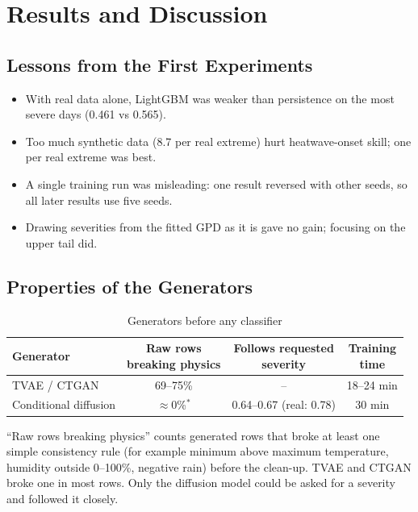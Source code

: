 \documentclass[12pt,a4paper]{report}
\begin{document}
\chapter{Results and Discussion}
\label{ch:results}
\section{Lessons from the First Experiments}
\label{sec:lessons}
\begin{itemize}
  \item With real data alone, LightGBM was weaker than persistence on the most severe days (0.461 vs 0.565).
  \item Too much synthetic data (8.7 per real extreme) hurt heatwave-onset skill; one per real extreme was best.
  \item A single training run was misleading: one result reversed with other seeds, so all later results use five seeds.
  \item Drawing severities from the fitted GPD as it is gave no gain; focusing on the upper tail did.
\end{itemize}

\section{Properties of the Generators}
\begin{table}[H]
\centering
\caption{Generators before any classifier}
\label{tab:genstats}
\small
\begin{tabular}{|l|c|c|c|}
\hline
\textbf{Generator} & \makecell{\textbf{Raw rows}\\\textbf{breaking physics}} & \makecell{\textbf{Follows requested}\\\textbf{severity}} & \makecell{\textbf{Training}\\\textbf{time}} \\ \hline
TVAE / CTGAN & 69--75\% & -- & 18--24 min \\ \hline
Conditional diffusion & $\approx$0\%$^{*}$ & 0.64--0.67 (real: 0.78) & 30 min \\ \hline
\end{tabular}

\end{table}
``Raw rows breaking physics'' counts generated rows that broke at least one simple consistency rule (for example
minimum above maximum temperature, humidity outside 0--100\%, negative rain) before the clean-up. TVAE and CTGAN
broke one in most rows. Only the diffusion model could be asked for a severity and followed it closely.
\end{document}
